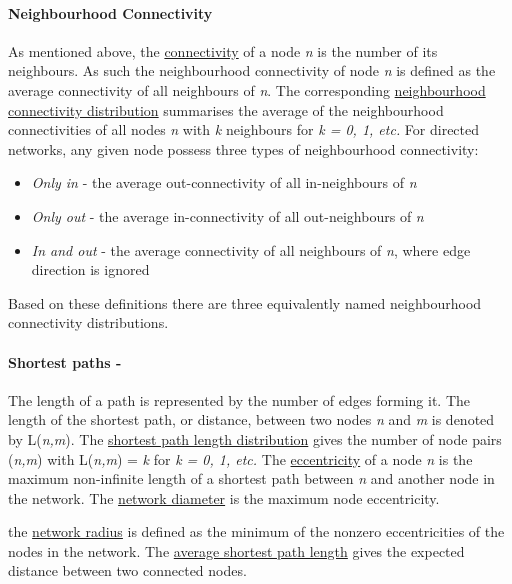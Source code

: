\paragraph{Neighbourhood Connectivity} 

As mentioned above, the \underline{connectivity} of a node \textit{n} is the number of its neighbours. As such the neighbourhood connectivity of node \textit{n} is defined as the average connectivity of all neighbours of \textit{n}. The corresponding \underline{neighbourhood connectivity distribution} summarises the average of the neighbourhood connectivities of all nodes \textit{n} with \textit{k} neighbours for \textit{k = 0, 1, etc.} For directed networks, any given node possess three types of neighbourhood connectivity:

\begin{itemize}
    \item \emph{Only in }- the average out-connectivity of all in-neighbours of \textit{n}
    \item \emph{Only out }- the average in-connectivity of all out-neighbours of \textit{n}
    \item \emph{In and out} - the average connectivity of all neighbours of \textit{n}, where edge direction is ignored
\end{itemize}

Based on these definitions there are three equivalently named neighbourhood connectivity distributions.

\paragraph{Shortest paths -}

The length of a path is represented by the number of edges forming it. The length of the shortest path, or distance, between two nodes \textit{n} and \textit{m} is denoted by L(\textit{n,m}). The \underline{shortest path length distribution} gives the number of node pairs (\textit{n,m}) with L(\textit{n,m}) = \textit{k} for \textit{k = 0, 1, etc.} The \underline{eccentricity} of a node \textit{n} is the maximum non-infinite length of a shortest path between \textit{n} and another node in the network. The \underline{network diameter} is the maximum node eccentricity. 

the \underline{network radius} is defined as the minimum of the nonzero eccentricities of the nodes in the network. The \underline{average shortest path length} gives the expected distance between two connected nodes.

